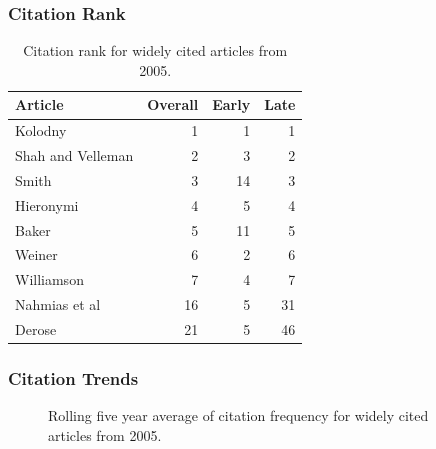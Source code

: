 \documentclass[
  10pt,
  letterpaper,
  DIV=11,
  numbers=noendperiod,
  twoside]{scrartcl}
\begin{document}
\subsubsection*{Citation Rank}\label{sec-rank-2005}

\begin{longtable}[]{@{}lrrr@{}}

\caption{\label{tbl-citation-rank-2005}Citation rank for widely cited
articles from 2005.}

\tabularnewline

\toprule\noalign{}
Article & Overall & Early & Late \\
\midrule\noalign{}
\endhead
\bottomrule\noalign{}
\endlastfoot
Kolodny & 1 & 1 & 1 \\
Shah and Velleman & 2 & 3 & 2 \\
Smith & 3 & 14 & 3 \\
Hieronymi & 4 & 5 & 4 \\
Baker & 5 & 11 & 5 \\
Weiner & 6 & 2 & 6 \\
Williamson & 7 & 4 & 7 \\
Nahmias et al & 16 & 5 & 31 \\
Derose & 21 & 5 & 46 \\

\end{longtable}

\subsubsection*{Citation Trends}\label{sec-trends-2005}

\begin{figure}


\caption{\label{fig-citation-spaghetti-2005}Rolling five year average of
citation frequency for widely cited articles from 2005.}

\end{figure}%
\end{document}
